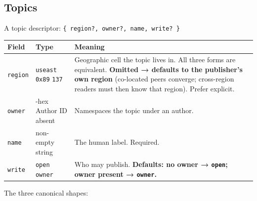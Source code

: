 \documentclass[
  nobib]{tufte-handout}
\newcounter{none} %
\begin{document}
\subsection{Topics}\label{topics}

A topic descriptor: \texttt{\{\ region?,\ owner?,\ name,\ write?\ \}}

{\def\LTcaptype{none} %
\begin{longtable}[]{@{}
  >{\raggedright\arraybackslash}p{}
  >{\raggedright\arraybackslash}p{}
  >{\raggedright\arraybackslash}p{}@{}}
\toprule\noalign{}
\begin{minipage}[b]{\linewidth}\raggedright
Field
\end{minipage} & \begin{minipage}[b]{\linewidth}\raggedright
Type
\end{minipage} & \begin{minipage}[b]{\linewidth}\raggedright
Meaning
\end{minipage} \\
\midrule\noalign{}
\endhead
\bottomrule\noalign{}
\endlastfoot
\texttt{region} & \texttt{\textquotesingle{}useast\textquotesingle{}}
\textbar{} \texttt{\textquotesingle{}0x89\textquotesingle{}} \textbar{}
\texttt{137} & Geographic cell the topic lives in. All three forms are
equivalent. \textbf{Omitted → defaults to the publisher's own region}
(co-located peers converge; cross-region readers must then know that
region). Prefer explicit. \\
\texttt{owner} & 64-hex Author ID \textbar{} absent & Namespaces the
topic under an author. \\
\texttt{name} & non-empty string & The human label. Required. \\
\texttt{write} & \texttt{\textquotesingle{}open\textquotesingle{}}
\textbar{} \texttt{\textquotesingle{}owner\textquotesingle{}} & Who may
publish. \textbf{Defaults: no owner →
\texttt{\textquotesingle{}open\textquotesingle{}}; owner present →
\texttt{\textquotesingle{}owner\textquotesingle{}}.} \\
\end{longtable}
}

The three canonical shapes:
\end{document}
